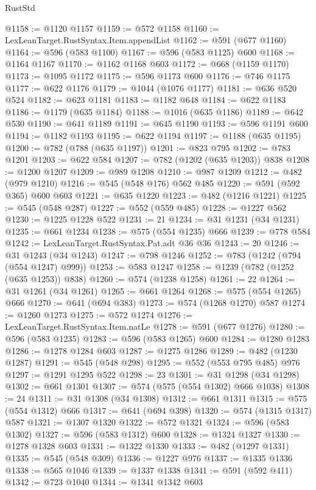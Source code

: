 \begin{lexlean}{RustStd}
\begin{coremodule}
{\begin{coremodule}
{{{{{{{{{{{{{{{{@1158 := @1120 @1157
@1159 := @572 @1158
@1160 := LexLeanTarget.RustSyntax.Item.appendList
@1162 := @591 (@677 @1160)
@1164 := @596 (@583 @1100)
@1167 := @596 (@583 @1125) @600
@1168 := @1164 @1167
@1170 := @1162 @1168 @603
@1172 := @668 (@1159 @1170)
@1173 := @1095 @1172
@1175 := @596 @1173 @600
@1176 := @746 @1175
@1177 := @622 @1176
@1179 := @1044 (@1076 @1177)
@1181 := @636 @520 @524
@1182 := @623 @1181
@1183 := @1182 @648
@1184 := @622 @1183
@1186 := @1179 (@635 @1184)
@1188 := @1016 (@635 @1186)
@1189 := @642 @530
@1190 := @641 @1189
@1191 := @645 @1190
@1193 := @596 @1191 @600
@1194 := @1182 @1193
@1195 := @622 @1194
@1197 := @1188 (@635 @1195)
@1200 := @782 (@788 (@635 @1197))
@1201 := @823 @795
@1202 := @783 @1201
@1203 := @622 @584
@1207 := @782 (@1202 (@635 @1203)) @838
@1208 := @1200 @1207
@1209 := @989 @1208
@1210 := @987 @1209
@1212 := @482 (@979 @1210)
@1216 := @545 (@548 @176) @562 @485
@1220 := @591 (@592 @365) @600 @603
@1221 := @635 @1220
@1223 := @482 (@1216 @1221)
@1225 := @545 (@548 @287)
@1227 := @552 (@559 @485)
@1228 := @1227 @562
@1230 := @1225 @1228 @522
@1231 := 21
@1234 := @31 @1231 (@34 @1231)
@1235 := @661 @1234
@1238 := @575 (@554 @1235) @666
@1239 := @778 @584
@1242 := LexLeanTarget.RustSyntax.Pat.adt @36 @36
@1243 := 20
@1246 := @31 @1243 (@34 @1243)
@1247 := @798 @1246
@1252 := @783 (@1242 (@794 (@554 @1247) @999))
@1253 := @583 @1247
@1258 := @1239 (@782 (@1252 (@635 @1253)) @838)
@1260 := @574 (@1238 @1258)
@1261 := 22
@1264 := @31 @1261 (@34 @1261)
@1265 := @661 @1264
@1268 := @575 (@554 @1265) @666
@1270 := @641 (@694 @383)
@1273 := @574 (@1268 @1270) @587
@1274 := @1260 @1273
@1275 := @572 @1274
@1276 := LexLeanTarget.RustSyntax.Item.natLe
@1278 := @591 (@677 @1276)
@1280 := @596 (@583 @1235)
@1283 := @596 (@583 @1265) @600
@1284 := @1280 @1283
@1286 := @1278 @1284 @603
@1287 := @1275 @1286
@1289 := @482 (@1230 @1287)
@1291 := @545 (@548 @298)
@1295 := @552 (@553 @795 @485) @976
@1297 := @1291 @1295 @522
@1298 := 23
@1301 := @31 @1298 (@34 @1298)
@1302 := @661 @1301
@1307 := @574 (@575 (@554 @1302) @666 @1038)
@1308 := 24
@1311 := @31 @1308 (@34 @1308)
@1312 := @661 @1311
@1315 := @575 (@554 @1312) @666
@1317 := @641 (@694 @398)
@1320 := @574 (@1315 @1317) @587
@1321 := @1307 @1320
@1322 := @572 @1321
@1324 := @596 (@583 @1302)
@1327 := @596 (@583 @1312) @600
@1328 := @1324 @1327
@1330 := @1278 @1328 @603
@1331 := @1322 @1330
@1333 := @482 (@1297 @1331)
@1335 := @545 (@548 @309)
@1336 := @1227 @976
@1337 := @1335 @1336
@1338 := @565 @1046
@1339 := @1337 @1338
@1341 := @591 (@592 @411)
@1342 := @723 @1040
@1344 := @1341 @1342 @603
}}}}}}}}}}}}}}}}
\end{coremodule}}
\end{coremodule}
\end{lexlean}
